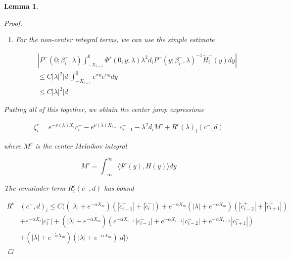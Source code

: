 \documentclass[12pt]{article}
\newtheorem{lemma}{Lemma}
\begin{document}
\begin{lemma}
\begin{proof}
\begin{enumerate}
\begin{align*}
&|(P_i^-(0; \lambda) - P^-(0))b_i^- + P_i^-(0; \lambda)(P_0^u(\lambda) - P_0^u(0))b_i^-| \\
&\leq C(|\lambda| + e^{-\alpha X_m}) |B_1(c, \tilde{c}, d)| \\
&\leq C(|\lambda| + e^{-\alpha X_m}) \Big( 
(|\lambda| + e^{-\tilde{\alpha}X_m})( |\tilde{c}_{i-1}^+| + |\tilde{c}_i^-|)
+ e^{-\tilde{\alpha} X_{i-1}} |c_{i-1}^-| + e^{-\tilde{\alpha} X_i} |c_i^-| + ( e^{-\tilde{\alpha}X_m} |D| + e^{-\tilde{\alpha}X_m}|\lambda| + |\lambda|^2)|d| \Big)
\end{align*}

\item For the non-center integral terms, we can use the simple estimate

\begin{align*}
&\left| P^-(0; \beta_i^-, \lambda) 
\int_{-X_{i-1}}^0 \Phi^s(0, y; \lambda) \lambda^2 d_i P^-(y; \beta_i^-, \lambda)^{-1} \tilde{H}_i^-(y) dy \right| \\
&\leq C |\lambda|^2 |d| \int_{-X_{i-1}}^0 e^{\alpha y} e^{\alpha y} dy \\
&\leq C |\lambda|^2 |d|
\end{align*}

\end{enumerate}

Putting all of this together, we obtain the center jump expressions

\begin{align*}
\xi^c_i = e^{-\nu(\lambda) X_i} c_i^- - e^{\nu(\lambda) X_{i-1}} c_{i-1}^- - \lambda^2 d_i M^c + R^c(\lambda)_i(c^-, d)
\end{align*}

where $M^c$ is the center Melnikov integral

\[
M^c = \int_{-\infty}^\infty \langle \Psi^c(y), H(y) \rangle dy 
\]

The remainder term $R^c_i(c^-, d)$ has bound

\begin{align*}
R^c&(c^-, d)_i \leq C \Big(
(|\lambda| + e^{-\alpha X_m})(|\tilde{c}_{i-1}^+| + |\tilde{c}_{i}^-|) + e^{-\alpha X_m}(|\lambda| + e^{-\alpha X_m})( |\tilde{c}_{i-2}^+| + |\tilde{c}_{i+1}^-|)  \\
&+ e^{-\alpha X_i} |c_i^-| + (|\lambda| + e^{-\tilde{\alpha} X_m})( e^{-\alpha X_{i-1}} |c_{i-1}^-| + e^{-\alpha X_{i-2}} |c_{i-2}^-| + e^{-\alpha X_{i+1}} |c_{i+1}^-|) \\
&+ (|\lambda| + e^{-\tilde{\alpha} X_m})(|\lambda| + e^{-\alpha X_m})|d|
\Big)
\end{align*}


\end{proof}
\end{lemma}
\end{document}
